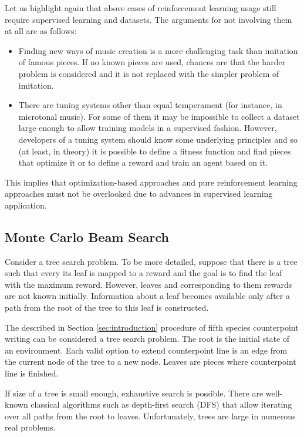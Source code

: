 \documentclass{article}
\begin{document}
Let us highlight again that above cases of reinforcement learning usage still require supervised learning and datasets. The arguments for not involving them at all are as follows:
\begin{itemize}
	\item Finding new ways of music creation is a more challenging task than imitation of famous pieces. If no known pieces are used, chances are that the harder problem is considered and it is not replaced with the simpler problem of imitation.
	\item There are tuning systems other than equal temperament (for instance, in microtonal music). For some of them it may be impossible to collect a dataset large enough to allow training models in a supervised fashion. However, developers of a tuning system should know some underlying principles and so (at least, in theory) it is possible to define a fitness function and find pieces that optimize it or to define a reward and train an agent based on it.
\end{itemize}
This implies that optimization-based approaches and pure reinforcement learning approaches must not be overlooked due to advances in supervised learning application.

\subsection{Monte Carlo Beam Search}
\label{subsec:montecarlo}

Consider a tree search problem. To be more detailed, suppose that there is a tree such that every its leaf is mapped to a reward and the goal is to find the leaf with the maximum reward. However, leaves and corresponding to them rewards are not known initially. Information about a leaf becomes available only after a path from the root of the tree to this leaf is constructed.

The described in Section \ref{sec:introduction} procedure of fifth species counterpoint writing can be considered a tree search problem. The root is the initial state of an environment. Each valid option to extend counterpoint line is an edge from the current node of the tree to a new node. Leaves are pieces where counterpoint line is finished. 

If size of a tree is small enough, exhaustive search is possible. There are well-known classical algorithms such as depth-first search (DFS) that allow iterating over all paths from the root to leaves. Unfortunately, trees are large in numerous real problems.
\end{document}
